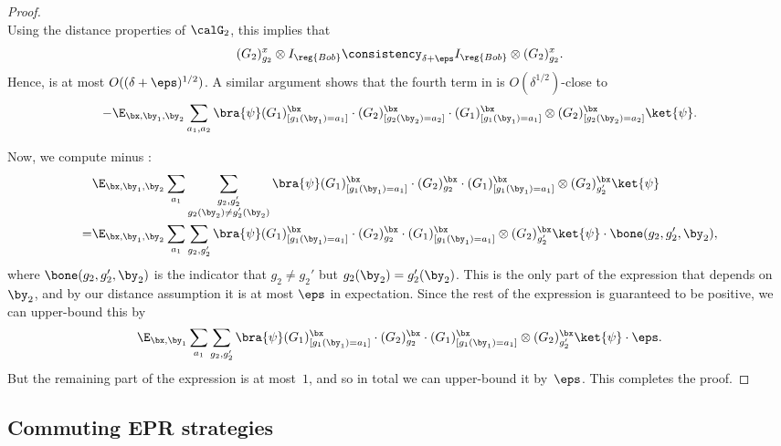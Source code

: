\begin{proof}
\begin{equation*}
\end{equation*}
Using the distance properties of $\calG_2$, this implies that
\begin{equation*}
(G_2)^{x}_{g_2} \otimes I_{\reg{Bob}}
\consistency_{\delta + \eps} I_{\reg{Bob}} \otimes (G_2)^{x}_{g_2}.
\end{equation*}
Hence,  is at most $O((\delta+\eps)^{1/2})$.
A similar argument shows that the fourth term in 
is $O(\delta^{1/2})$-close to
\begin{equation}\label{eq:strife}
-\E_{\bx, \by_1, \by_2} \sum_{a_1, a_2} \bra{\psi}
(G_1)^{\bx}_{[g_1(\by_1) = a_1]} \cdot (G_2)^\bx_{[g_2(\by_2) = a_2]} \cdot (G_1)^{\bx}_{[g_1(\by_1) = a_1]} \otimes (G_2)^\bx_{[g_2(\by_2) = a_2]} \ket{\psi}.
\end{equation}

Now, we compute  minus :
\begin{align*}
&\E_{\bx, \by_1, \by_2} \sum_{a_1}\sum_{\substack{g_2, g_2'\\g_2(\by_2) \neq g_2'(\by_2)}} \bra{\psi}
	 (G_1)^{\bx}_{[g_1(\by_1) = a_1]} \cdot (G_2)^{\bx}_{g_2} \cdot (G_1)^{\bx}_{[g_1(\by_1) = a_1]} \otimes (G_2)^{\bx}_{g_2'} \ket{\psi}\\
=&\E_{\bx, \by_1, \by_2} \sum_{a_1}\sum_{g_2, g_2'} \bra{\psi}
	 (G_1)^{\bx}_{[g_1(\by_1) = a_1]} \cdot (G_2)^{\bx}_{g_2} \cdot (G_1)^{\bx}_{[g_1(\by_1) = a_1]} \otimes (G_2)^{\bx}_{g_2'} \ket{\psi}
	 	\cdot \bone(g_2, g_2', \by_2),
\end{align*}
where $\bone(g_2, g_2', \by_2)$ is the indicator that $g_2 \neq g_2'$ but $g_2(\by_2) = g_2'(\by_2)$.
This is the only part of the expression that depends on $\by_2$, and by our distance assumption it is at most $\eps$ in expectation.
Since the rest of the expression is guaranteed to be positive, we can upper-bound this by
\begin{equation*}
\E_{\bx, \by_1} \sum_{a_1}\sum_{g_2, g_2'} \bra{\psi}
	 (G_1)^{\bx}_{[g_1(\by_1) = a_1]} \cdot (G_2)^{\bx}_{g_2} \cdot (G_1)^{\bx}_{[g_1(\by_1) = a_1]} \otimes (G_2)^{\bx}_{g_2'} \ket{\psi} \cdot \eps.
\end{equation*}
But the remaining part of the expression is at most~$1$, and so in total we can upper-bound it by~$\eps$.
This completes the proof.
\end{proof}

\subsection{Commuting EPR strategies}

